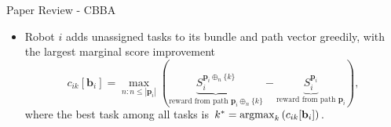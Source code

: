 \begin{frame}{Paper Review - CBBA}
    \begin{itemize}
        \item Robot $i$ adds unassigned tasks to its bundle and path vector greedily, with the largest marginal score improvement
        \begin{equation*}
            c_{ik}[\mathbf{b}_i] = \max_{n:n\le |\mathbf{p}_i|}\left( \underbrace{S_{i}^{\mathbf{p}_i \oplus_n \{k\}}}_{\text{reward from path $\mathbf{p}_i \oplus_n \{k\}$}} - \underbrace{S_{i}^{\mathbf{p}_i}}_{\text{reward from path $\mathbf{p}_i$}} \right),
        \end{equation*}
        where the best task among all tasks is 
            $k^* = \mathop{\rm argmax}_{k} \left(c_{ik}[\mathbf{b}_i]\right)$.
    \end{itemize}
\end{frame}

